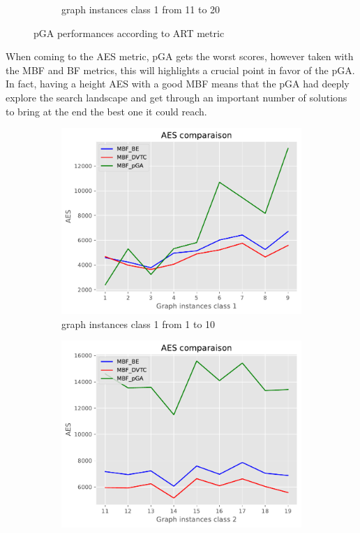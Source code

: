 \documentclass[review]{elsarticle}
\begin{document}
\begin{center}
\begin{figure}[H]
\begin{subfigure}{0.45\textwidth}
			\caption{\label{ART_METRIC_C2} graph instances class 1 from 11 to 20}
		\end{subfigure}
		\caption{\label{ART_METRIC}pGA performances according to ART metric}
		
	\end{figure}
\end{center}
When coming to the AES metric,  pGA gets the worst scores, however taken with the MBF and BF metrics, this will highlights a crucial point in favor of the pGA. In fact, having a height AES with a good MBF means that the pGA had deeply explore the search landscape and get through an important number of solutions to bring at the end the best one it could reach.
\begin{center}
	\begin{figure}[H]
		\begin{subfigure}{0.45\textwidth}
			\includegraphics[width=\textwidth]{figurePaper/AES_C1.pdf} 
			\caption{\label{AES_METRIC_C1} graph instances class 1 from 1 to 10}
		\end{subfigure}
		\hfill
		\begin{subfigure}{0.45\textwidth}
			\includegraphics[width=\textwidth]{figurePaper/AES_C2.pdf} 

\end{subfigure}
\end{figure}
\end{center}
\end{document}
